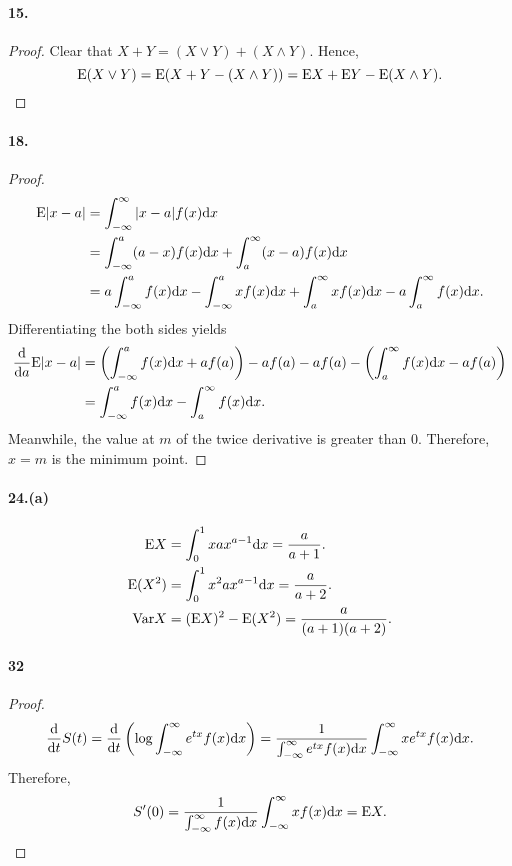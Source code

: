 \paragraph{15.}
\begin{proof}
  Clear that $X+Y=(X\lor Y)+(X\land Y)$. Hence,
  \[
    \mathrm{E}(X\lor Y) = \mathrm{E}(X+Y-(X\land Y)) = \mathrm{E} X+\mathrm{E} Y-\mathrm{E}(X\land Y).
  \]
\end{proof}

\paragraph{18.}
\begin{proof}
  \[\begin{split}
    \mathrm{E}|x-a| &= \int_{-\infty}^\infty |x-a|f(x)\mathrm{d} x  \\
    &= \int_{-\infty}^a(a-x)f(x)\mathrm{d} x + \int_a^\infty(x-a)f(x)\mathrm{d} x \\
    &= a\int_{-\infty}^a f(x)\mathrm{d} x - \int_{-\infty}^axf(x)\mathrm{d} x
       + \int_a^\infty xf(x)\mathrm{d} x - a\int_a^\infty f(x)\mathrm{d} x.
  \end{split}\]
  Differentiating the both sides yields
  \[\begin{split}
    \frac{\mathrm{d}}{\mathrm{d} a}\mathrm{E}|x-a| 
    &= \left(\int_{-\infty}^a f(x)\mathrm{d} x + af(a)\right) 
       - af(a) - af(a) - 
       \left( \int_a^\infty f(x)\mathrm{d} x - af(a)\right) \\
    &= \int_{-\infty}^af(x)\mathrm{d} x - \int_a^\infty f(x)\mathrm{d} x.
  \end{split}\]
  Meanwhile, the value at $m$ of the twice derivative is greater than $0$.
  Therefore, $x=m$ is the minimum point.
\end{proof}

\paragraph{24.(a)}
\begin{solution}
  \begin{align*}
    \mathrm{E} X &= \int_0^1 xax^{a-1}\mathrm{d} x = \frac{a}{a+1}. \\
    \mathrm{E}(X^2) &= \int_0^1 x^2ax^{a-1}\mathrm{d} x = \frac{a}{a+2}. \\
    \mathrm{Var} X &= (\mathrm{E} X)^2 - \mathrm{E}(X^2) = \frac{a}{(a+1)(a+2)}.
  \end{align*}
\end{solution}

\paragraph{32}
\begin{proof}
  \begin{align*}
    \frac{\mathrm{d}}{\mathrm{d} t}S(t)
    = \frac{\mathrm{d}}{\mathrm{d} t}\left(\log\int_{-\infty}^\infty e^{tx}f(x)\mathrm{d} x\right)
    = \frac{1}{\int_{-\infty}^\infty e^{tx}f(x)\mathrm{d} x}
       \int_{-\infty}^\infty xe^{tx}f(x)\mathrm{d} x.
  \end{align*}
  Therefore,
  \[
    S^\prime(0) 
    = \frac{1}{\int_{-\infty}^\infty f(x)\mathrm{d} x}
      \int_{-\infty}^\infty xf(x) \mathrm{d} x = \mathrm{E} X.
  \]
\end{proof}



